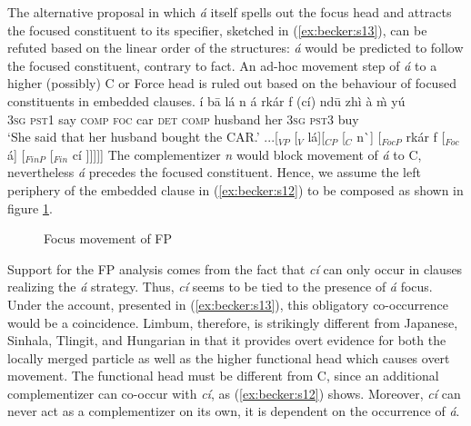 \documentclass[output=paper,
modfonts
]{langscibook}
\begin{document}
The alternative proposal in which {\em \'a} itself spells out the focus head and attracts the focused constituent to its specifier, sketched in (\ref{ex:becker:s13}), can be refuted based on the linear order of the structures: {\em \'a} would be predicted to follow the focused constituent, contrary to fact. An ad-hoc movement step of {\em \'a} to a higher (possibly) C or Force head is ruled out based on the behaviour of focused constituents in embedded clauses.
\ea
\ea \label{ex:becker:s12}
\gll \'i b\=a l\'a n \'a rk\'ar f (c\'i) {nd\=u} {zh\`i} \`a \`m y\'u \\  
     \textsc{3sg} \textsc{pst1} say \textsc{comp} \textsc{foc} car \textsc{det} \textsc{comp} {husband} her \textsc{3sg} \textsc{pst3} buy  \\ 
\glt `She said that her husband bought the CAR.'
\ex *...[$_{VP}$ [$_{V}$ l\'a][$_{CP}$ [$_{C}$ n\`\textepsilon] [$_{FocP}$ rk\'ar f [$_{Foc}$ \'a] [$_{FinP}$ [$_{Fin}$ c\'i ]]]]] \label{ex:becker:s13}
\z \z
\vspace{3mm}
\noindent The complementizer {\em n} would block movement of {\em \'a} to C, nevertheless {\em \'a} precedes the focused constituent. Hence, we assume the left periphery of the embedded clause in (\ref{ex:becker:s12}) to be composed as shown in figure \ref{fig:syntax:f1}.
\begin{figure}
\caption{Focus movement of FP}
\label{fig:syntax:f1}
\end{figure}
Support for the FP analysis comes from the fact that {\em c\'i} can only occur in clauses realizing the {\em \'a} strategy. Thus, {\em c\'i} seems to be tied to the presence of {\em \'a} focus. Under the account, presented in (\ref{ex:becker:s13}), this obligatory co-occurrence would be a coincidence. Limbum, therefore, is strikingly different from Japanese, Sinhala, Tlingit, and Hungarian in that it provides overt evidence for both the locally merged particle as well as the higher functional head which causes overt movement. The functional head must be different from C, since an additional complementizer can co-occur with {\em c\'i}, as (\ref{ex:becker:s12}) shows. Moreover, {\em c\'i} can never act as a complementizer on its own, it is dependent on the occurrence of {\em \'a}.
\end{document}
